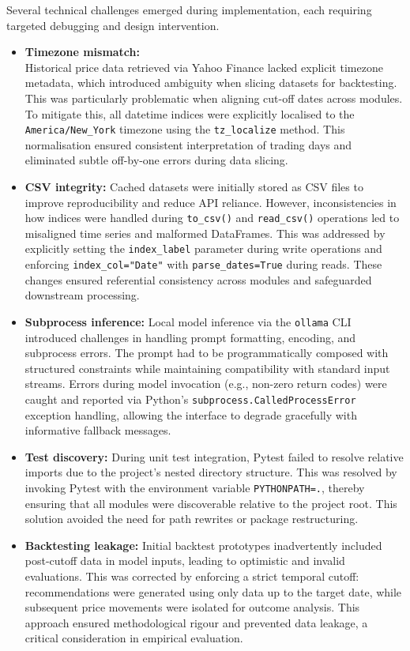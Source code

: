 Several technical challenges emerged during implementation, each requiring targeted debugging and design intervention.

\begin{itemize}

\item \textbf{Timezone mismatch:}\\
Historical price data retrieved via Yahoo Finance lacked explicit timezone metadata, which introduced ambiguity when slicing datasets for backtesting. This was particularly problematic when aligning cut-off dates across modules. To mitigate this, all datetime indices were explicitly localised to the \texttt{America/New\_York} timezone using the \texttt{tz\_localize} method. This normalisation ensured consistent interpretation of trading days and eliminated subtle off-by-one errors during data slicing.

\item \textbf{CSV integrity:}
Cached datasets were initially stored as CSV files to improve reproducibility and reduce API reliance. However, inconsistencies in how indices were handled during \texttt{to\_csv()} and \texttt{read\_csv()} operations led to misaligned time series and malformed DataFrames. This was addressed by explicitly setting the \texttt{index\_label} parameter during write operations and enforcing \texttt{index\_col="Date"} with \texttt{parse\_dates=True} during reads. These changes ensured referential consistency across modules and safeguarded downstream processing.

\item \textbf{Subprocess inference:}
Local model inference via the \texttt{ollama} CLI introduced challenges in handling prompt formatting, encoding, and subprocess errors. The prompt had to be programmatically composed with structured constraints while maintaining compatibility with standard input streams. Errors during model invocation (e.g., non-zero return codes) were caught and reported via Python’s \texttt{subprocess.CalledProcessError} exception handling, allowing the interface to degrade gracefully with informative fallback messages.

\item \textbf{Test discovery:}
During unit test integration, Pytest failed to resolve relative imports due to the project’s nested directory structure. This was resolved by invoking Pytest with the environment variable \texttt{PYTHONPATH=.}, thereby ensuring that all modules were discoverable relative to the project root. This solution avoided the need for path rewrites or package restructuring.

\item \textbf{Backtesting leakage:}
Initial backtest prototypes inadvertently included post-cutoff data in model inputs, leading to optimistic and invalid evaluations. This was corrected by enforcing a strict temporal cutoff: recommendations were generated using only data up to the target date, while subsequent price movements were isolated for outcome analysis. This approach ensured methodological rigour and prevented data leakage, a critical consideration in empirical evaluation.

\end{itemize}

